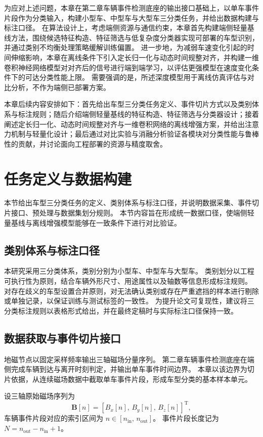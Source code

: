 \documentclass{xdupgthesis}
\begin{document}
为应对上述问题，本章在第二章车辆事件检测底座的输出接口基础上，以单车事件片段作为分类输入，构建小型车、中型车与大型车三分类任务，并给出数据构建与标注口径。
在算法设计上，考虑端侧资源与通信约束，本章首先构建端侧轻量基线方法，围绕候选特征构造、特征筛选与低复杂度分类器实现可部署的车型识别，并通过类别不均衡处理策略缓解训练偏置。
进一步地，为减弱车速变化引起的时间伸缩影响，本章在离线条件下引入定长归一化与动态时间规整对齐，并构建一维卷积神经网络模型对对齐后的信号进行端到端学习，以评估更强模型在速度变化条件下的可达分类性能上限。
需要强调的是，所述深度模型用于离线仿真评估与对比分析，不作为端侧已部署方案。

本章后续内容安排如下：首先给出车型三分类任务定义、事件切片方式以及类别体系与标注规则；随后介绍端侧轻量基线的特征构造、特征筛选与分类器设计；接着阐述定长归一化、动态时间规整对齐与一维卷积网络的离线增强方案，并给出注意力机制与轻量化设计；最后通过对比实验与消融分析验证各模块对分类性能与鲁棒性的贡献，并讨论面向工程部署的资源与精度取舍。



\section{任务定义与数据构建}

本节给出车型三分类任务的定义、类别体系与标注口径，并说明数据采集、事件切片接口、预处理与数据集划分规则。
本节内容旨在形成统一数据口径，使端侧轻量基线与离线增强模型能够在一致条件下进行对比验证。

\subsection{类别体系与标注口径}
本研究采用三分类体系，类别分别为小型车、中型车与大型车。
类别划分以工程可执行性为原则，结合车辆外形尺寸、用途属性以及轴数等信息形成标注规则。
对存在歧义的车型设置合并原则，对无法确认类别或存在严重遮挡的样本进行剔除或单独记录，以保证训练与测试标签的一致性。
为提升论文可复现性，建议将三分类标注规则以表格形式给出，并在最终定稿时与实际标注口径保持一致。

\subsection{数据获取与事件切片接口}
地磁节点以固定采样频率输出三轴磁场分量序列。
第二章车辆事件检测底座在端侧完成车辆到达与离开时刻判定，并输出单车事件时间边界。
本章以该边界为切片依据，从连续磁场数据中截取单车事件片段，形成车型分类的基本样本单元。

设三轴原始磁场序列为
\[
\mathbf{B}[n]=\left[B_x[n],\,B_y[n],\,B_z[n]\right]^{\mathrm{T}},
\]
车辆事件片段对应的索引区间为 $n\in[n_{\mathrm{in}},\,n_{\mathrm{out}}]$。
事件片段长度记为 $N=n_{\mathrm{out}}-n_{\mathrm{in}}+1$。
\end{document}
